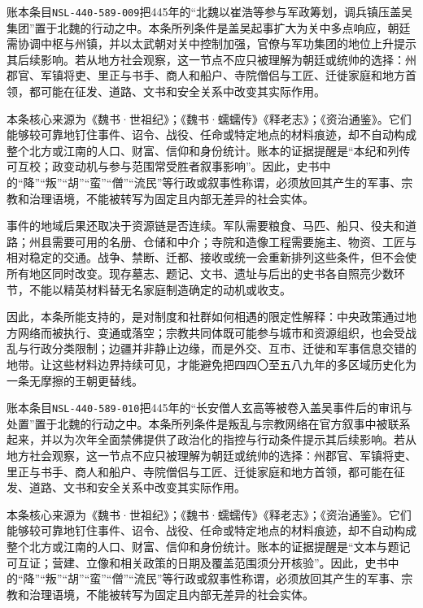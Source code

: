 账本条目\texttt{NSL-440-589-009}把445年的“北魏以崔浩等参与军政筹划，调兵镇压盖吴集团”置于北魏的行动之中。本条所列条件是盖吴起事扩大为关中多点响应，朝廷需协调中枢与州镇，并以太武朝对关中控制加强，官僚与军功集团的地位上升提示其后续影响。若从地方社会观察，这一节点不应只被理解为朝廷或统帅的选择：州郡官、军镇将吏、里正与书手、商人和船户、寺院僧侣与工匠、迁徙家庭和地方首领，都可能在征发、道路、文书和安全关系中改变其实际作用。

本条核心来源为《魏书·世祖纪》；《魏书·蠕蠕传》《释老志》；《资治通鉴》。它们能够较可靠地钉住事件、诏令、战役、任命或特定地点的材料痕迹，却不自动构成整个北方或江南的人口、财富、信仰和身份统计。账本的证据提醒是“本纪和列传可互校；政变动机与参与范围常受胜者叙事影响”。因此，史书中的“降”“叛”“胡”“蛮”“僧”“流民”等行政或叙事性称谓，必须放回其产生的军事、宗教和治理语境，不能被转写为固定且内部无差异的社会实体。

事件的地域后果还取决于资源链是否连续。军队需要粮食、马匹、船只、役夫和道路；州县需要可用的名册、仓储和中介；寺院和造像工程需要施主、物资、工匠与相对稳定的交通。战争、禁断、迁都、接收或统一会重新排列这些条件，但不会使所有地区同时改变。现存墓志、题记、文书、遗址与后出的史书各自照亮少数环节，不能以精英材料替无名家庭制造确定的动机或收支。

因此，本条所能支持的，是对制度和社群如何相遇的限定性解释：中央政策通过地方网络而被执行、变通或落空；宗教共同体既可能参与城市和资源组织，也会受战乱与行政分类限制；边疆并非静止边缘，而是外交、互市、迁徙和军事信息交错的地带。让这些材料边界持续可见，才能避免把四四〇至五八九年的多区域历史化为一条无摩擦的王朝更替线。

账本条目\texttt{NSL-440-589-010}把445年的“长安僧人玄高等被卷入盖吴事件后的审讯与处置”置于北魏的行动之中。本条所列条件是叛乱与宗教网络在官方叙事中被联系起来，并以为次年全面禁佛提供了政治化的指控与行动条件提示其后续影响。若从地方社会观察，这一节点不应只被理解为朝廷或统帅的选择：州郡官、军镇将吏、里正与书手、商人和船户、寺院僧侣与工匠、迁徙家庭和地方首领，都可能在征发、道路、文书和安全关系中改变其实际作用。

本条核心来源为《魏书·世祖纪》；《魏书·蠕蠕传》《释老志》；《资治通鉴》。它们能够较可靠地钉住事件、诏令、战役、任命或特定地点的材料痕迹，却不自动构成整个北方或江南的人口、财富、信仰和身份统计。账本的证据提醒是“文本与题记可互证；营建、立像和相关政策的日期及覆盖范围须分开核验”。因此，史书中的“降”“叛”“胡”“蛮”“僧”“流民”等行政或叙事性称谓，必须放回其产生的军事、宗教和治理语境，不能被转写为固定且内部无差异的社会实体。

